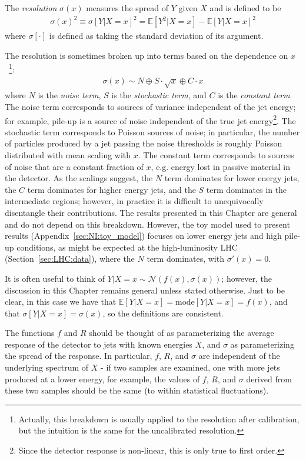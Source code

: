 The \textit{resolution} $\sigma(x)$ measures the spread of $Y$ given $X$ and is defined to be
\begin{align}
  \sigma(x)^2 \equiv \sigma[Y|X=x]^2 = \mathbb{E}[Y^2|X=x]-\mathbb{E}[Y|X=x]^2
\end{align}
where $\sigma[\cdot]$ is defined as taking the standard deviation of its argument.

The resolution is sometimes broken up into terms based on the dependence on $x$~\cite{PERF-2011-04,Aaboud:2019ibw}\footnote{Actually, this breakdown is usually applied to the resolution after calibration, but the intuition is the same for the uncalibrated resolution.}:
\begin{align}
  \sigma(x) \sim N \oplus S\cdot\sqrt{x} \oplus C\cdot x
\end{align}
where $N$ is the \textit{noise term}, $S$ is the \textit{stochastic term}, and $C$ is the \textit{constant term}.
The noise term corresponds to sources of variance independent of the jet energy; for example, pile-up is a source of noise independent of the true jet energy\footnote{Since the detector response is non-linear, this is only true to first order.}.
The stochastic term corresponds to Poisson sources of noise; in particular, the number of particles produced by a jet passing the noise thresholds is roughly Poisson distributed with mean scaling with $x$.    
The constant term corresponds to sources of noise that are a constant fraction of $x$, e.g. energy lost in passive material in the detector.
As the scalings suggest, the $N$ term dominates for lower energy jets, the $C$ term dominates for higher energy jets, and the $S$ term dominates in the intermediate regions; however, in practice it is difficult to unequivocally disentangle their contributions.
The results presented in this Chapter are general and do not depend on this breakdown.
However, the toy model used to present results (Appendix~\ref{sec:NI:toy_model}) focuses on lower energy jets and high pile-up conditions, as might be expected at the high-luminosity LHC (Section~\ref{sec:LHC:data}), where the $N$ term dominates, with $\sigma'(x)=0$.

It is often useful to think of $Y|X=x\sim \mathcal{N}(f(x),\sigma(x))$; however, the discussion in this Chapter remains general unless stated otherwise.
Just to be clear, in this case we have that $\mathbb{E}[Y|X=x]=\text{mode}[Y|X=x]=f(x)$, and that $\sigma[Y|X=x] = \sigma(x)$, so the definitions are consistent.


The functions $f$ and $R$ should be thought of as parameterizing the average response of the detector to jets with known energies $X$, and $\sigma$ as parameterizing the spread of the response.
In particular, $f$, $R$, and $\sigma$ are independent of the underlying spectrum of $X$ - if two samples are examined, one with more jets produced at a lower energy, for example, the values of $f$, $R$, and $\sigma$ derived from these two samples should be the same (to within statistical fluctuations).

